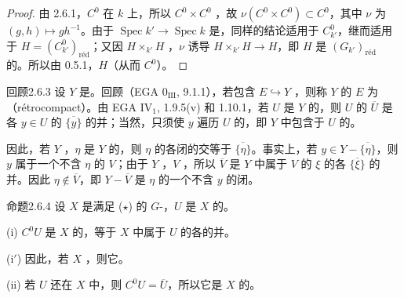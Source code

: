 \begin{proof}
由 2.6.1，$C^0$ 在 $k$ 上，所以 $C^0\times C^0$ ，故 $\nu(C^0\times C^0)\subset C^0$，其中 $\nu$ 为 $(g,h)\mapsto gh^{-1}$。由于 $\operatorname{Spec}k'\to\operatorname{Spec}k$ 是，同样的结论适用于 $C^0_{k'}$，继而适用于 $H=(C^0_{k'})_{\mathrm{r\text{é}d}}$；又因 $H\times_{k'}H$ ，$\nu$ 诱导 $H\times_{k'}H\to H$，即 $H$ 是 $(G_{k'})_{\mathrm{r\text{é}d}}$ 的。所以由 0.5.1，$H$（从而 $C^0$）。
\end{proof}
\begin{SGAresult}{回顾}{2.6.3}
设 $Y$ 是。回顾（EGA $0_{\mathrm{III}}$, 9.1.1），若包含 $E\hookrightarrow Y$ ，则称 $Y$ 的 $E$ 为（rétrocompact）。由 EGA IV$_1$, 1.9.5(v) 和 1.10.1，若 $U$ 是 $Y$ 的，则 $U$ 的 $\overline U$ 是各 $y\in U$ 的 $\overline{\{y\}}$ 的并；当然，只须使 $y$ 遍历 $U$ 的，即 $Y$ 中包含于 $U$ 的。

因此，若 $Y$ ，$\eta$ 是 $Y$ 的，则 $\eta$ 的各闭的交等于 $\overline{\{\eta\}}$。事实上，若 $y\in Y-\overline{\{\eta\}}$，则 $y$ 属于一个不含 $\eta$ 的 $V$；由于 $Y$ ，$V$ ，所以 $\overline V$ 是 $Y$ 中属于 $V$ 的 $\xi$ 的各 $\overline{\{\xi\}}$ 的并。因此 $\eta\notin\overline V$，即 $Y-\overline V$ 是 $\eta$ 的一个不含 $y$ 的闭。
\end{SGAresult}
\begin{SGAresult}{命题}{2.6.4}
设 $X$ 是满足 ($\star$) 的 $G$-，$U$ 是 $X$ 的。

(i) $C^0U$ 是 $X$ 的，等于 $X$ 中属于 $U$ 的各的并。

(i$'$) 因此，若 $X$ ，则它。

(ii) 若 $U$ 还在 $X$ 中，则 $C^0U=\overline U$，所以它是 $X$ 的。
\end{SGAresult}
